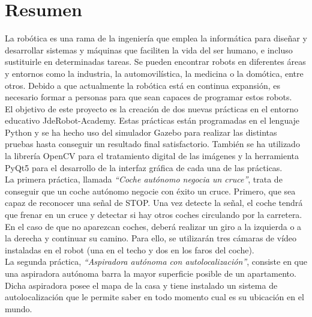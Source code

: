 \chapter*{Resumen}

La robótica es una rama de la ingeniería que emplea la informática para diseñar y desarrollar sistemas y máquinas que faciliten la vida del ser humano, e incluso sustituirle en determinadas tareas. Se pueden encontrar robots en diferentes áreas y entornos como la industria, la automovilística, la medicina o la domótica, entre otros. Debido a que actualmente la robótica está en continua expansión, es necesario formar a personas para que sean capaces de programar estos robots. \\

El objetivo de este proyecto es la creación de dos nuevas prácticas en el entorno educativo JdeRobot-Academy. Estas prácticas están programadas en el lenguaje Python y se ha hecho uso del simulador Gazebo para realizar las distintas pruebas hasta conseguir un resultado final satisfactorio. También se ha utilizado la librería OpenCV para el tratamiento digital de las imágenes y la herramienta PyQt5 para el desarrollo de la interfaz gráfica de cada una de las prácticas.\\

La primera práctica, llamada \textit{``Coche autónomo negocia un cruce''}, trata de conseguir que un coche autónomo negocie con éxito un cruce. Primero, que sea capaz de reconocer una señal de STOP. Una vez detecte la señal, el coche tendrá que frenar en un cruce y detectar si hay otros coches circulando por la carretera. En el caso de que no aparezcan coches, deberá realizar un giro a la izquierda o a la derecha y continuar su camino. Para ello, se utilizarán tres cámaras de vídeo instaladas en el robot (una en el techo y dos en los faros del coche). \\

La segunda práctica, \textit{``Aspiradora autónoma con autolocalización''}, consiste en que una aspiradora autónoma barra la mayor superficie posible de un apartamento. Dicha aspiradora posee el mapa de la casa y tiene instalado un sistema de autolocalización que le permite saber en todo momento cual es su ubicación en el mundo.


